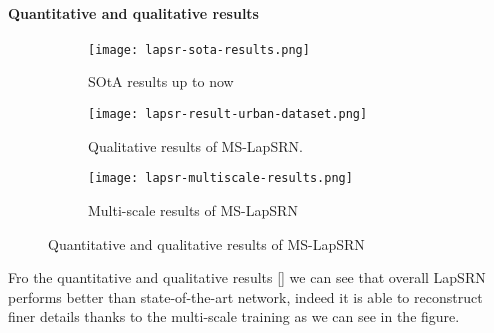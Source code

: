 \paragraph{Quantitative and qualitative results}

\begin{figure}
    \begin{subfigure}{0.49\textwidth}
        \centering
        \texttt{[image: lapsr-sota-results.png]}
        \caption{SOtA results up to now}
    \end{subfigure}
    \begin{subfigure}{0.49\textwidth}
        \centering
        \texttt{[image: lapsr-result-urban-dataset.png]}
        \caption{Qualitative results of MS-LapSRN.}
    \end{subfigure}
    \begin{subfigure}{0.49\textwidth}
        \centering
        \texttt{[image: lapsr-multiscale-results.png]}
        \caption{Multi-scale results of MS-LapSRN}
    \end{subfigure}
    \caption{Quantitative and qualitative results of MS-LapSRN}\label{lapsr:qq-results}
\end{figure}

Fro the quantitative and qualitative results [] we can see that overall LapSRN performs better than state-of-the-art network, indeed it is able to reconstruct finer details thanks to the multi-scale training as we can see in the figure.